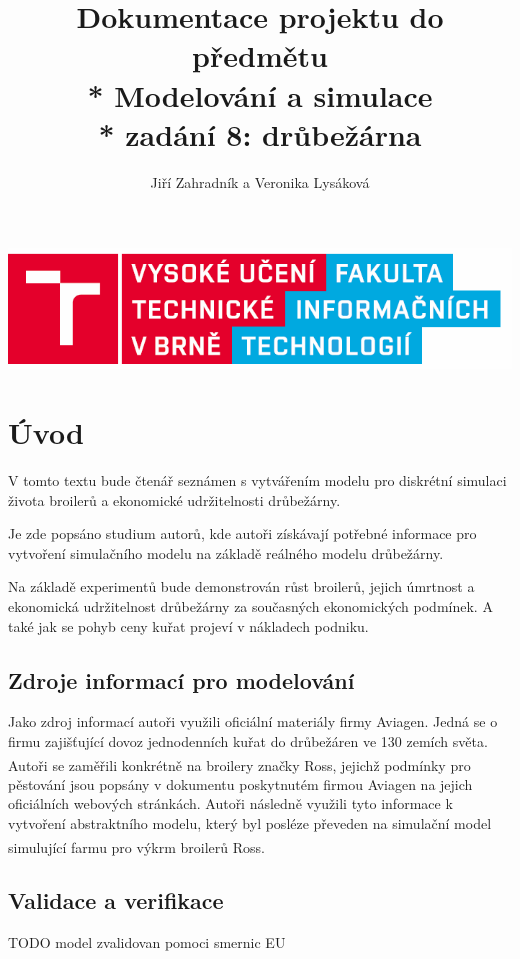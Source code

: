 \documentclass[a4paper,10pt]{article}
\title{Dokumentace projektu do předmětu \\* Modelování a simulace\\* zadání 8: drůbežárna}
\author{Jiří Zahradník a Veronika Lysáková}
\date{}
\begin{document}
\maketitle
\includegraphics[scale=0.5]{fitnewb.png}
\pagebreak

\renewcommand{\contentsname}{Obsah}
\tableofcontents




\pagebreak

%
%

\section{Úvod}
V tomto textu bude čtenář seznámen s vytvářením modelu pro diskrétní simulaci 
života broilerů a ekonomické udržitelnosti drůbežárny.
\par 
Je zde popsáno studium autorů, kde autoři získávají potřebné informace
pro vytvoření simulačního modelu na základě reálného modelu drůbežárny.
\par
Na základě experimentů bude demonstrován růst broilerů, jejich úmrtnost
a ekonomická udržitelnost drůbežárny za současných ekonomických podmínek.
A také jak se pohyb ceny kuřat projeví v nákladech podniku. 
\subsection{Zdroje informací pro modelování\cite{modelovani}}
Jako zdroj informací autoři využili oficiální materiály firmy Aviagen\cite{aviagen}.
Jedná se o firmu zajišťující dovoz jednodenních kuřat do drůbežáren ve 130 zemích světa.
Autoři se zaměřili konkrétně na broilery značky Ross\textsuperscript{\textregistered},
jejichž podmínky pro pěstování jsou popsány v dokumentu poskytnutém firmou Aviagen\cite{ross}
na jejich oficiálních webových stránkách. Autoři následně využili tyto informace k
vytvoření abstraktního modelu\cite{abstract_model}, který byl posléze převeden na simulační model\cite{simulation_model}
simulující farmu pro výkrm broilerů Ross\textsuperscript{\textregistered}. 
\subsection{Validace a verifikace}
TODO model zvalidovan pomoci smernic EU
\end{document}
